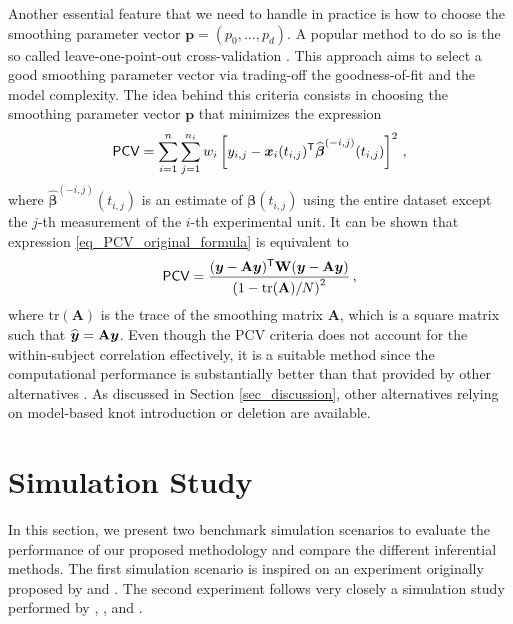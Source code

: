 \documentclass[letterpaper,10pt,openany]{article}
\def\frac#1#2{{{#1}\over{#2}}}
\def\A{\mathbf{A}}\def\a{\mathbf{a}}\def\Av{\boldsymbol{A}}\def\av{\boldsymbol{a}}
\def\W{\mathbf{W}}\def\w{\mathbf{w}}\def\Wv{\boldsymbol{W}}\def\wv{\boldsymbol{w}}
\def\betav{\boldsymbol{\beta}}
\def\trans{\text{\textsf{T}}}
\begin{document}
Another essential feature that we need to handle in practice is how to choose the smoothing parameter vector $\boldsymbol{p} = (p_0,\ldots,p_d)$. A popular method to do so is the so called leave-one-point-out cross-validation \cite[\textsf{PCV},][]{eubank-et-al-04}. This approach aims to select a good smoothing parameter vector via trading-off the goodness-of-fit and the model complexity. The idea behind this criteria consists in choosing the smoothing parameter vector $\boldsymbol{p}$ that minimizes the expression
\begin{equation}\label{eq_PCV_original_formula}
\textsf{PCV} = \sum_{i=1}^n \sum_{j=1}^{n_i} w_i \left[ y_{i,j} - \xv_i(t_{i,j})^\trans\widehat{\betav}^{(-i,j)}(t_{i,j}) \right]^2\,,
\end{equation}
where $\widehat{\betav}^{(-i,j)}(t_{i,j})$ is an estimate of $\betav(t_{i,j})$ using the entire dataset except the $j$-th measurement of the $i$-th experimental unit. It can be shown that expression \eqref{eq_PCV_original_formula} is equivalent to
\begin{equation}\label{PCV_smooth_matrix}
\textsf{PCV} = \frac{(\yv-\A\yv)^\trans\W(\yv-\A\yv)}{\left(1-\text{tr}(\A)/N\right)^2}\,,
\end{equation}
where $\text{tr}(\A)$ is the trace of the smoothing matrix $\A$, which is a square matrix such that $\widehat\yv = \A\yv$. 
Even though the \textsf{PCV} criteria does not account for the within-subject correlation effectively, it is a suitable method since the computational performance is substantially better than that provided by other alternatives \citep[e.g., leave-one-subject-out cross-validation; see][for details]{wu-tian-2018}. As discussed in Section \ref{sec_discussion}, other alternatives relying on model-based knot introduction or deletion are available.


\section{Simulation Study} \label{sec_simulation}


In this section, we present two benchmark simulation scenarios to evaluate the performance of our proposed methodology and compare the different inferential methods. The first simulation scenario is inspired on an experiment originally proposed by \cite{wu-2004-backfitting} and \cite{wu-zhang-06}. The second experiment follows very closely a simulation study performed by \cite{wu-2000-kernel}, \cite{huang-2002-varying}, and \cite{wu-tian-2018}.
\end{document}
